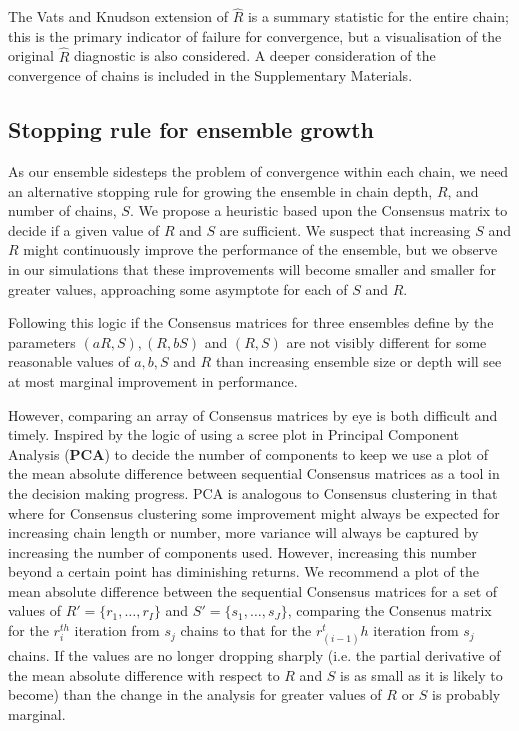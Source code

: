 \documentclass{bioinfo}
\begin{document}
The Vats and Knudson extension of $\hat{R}$ is a summary statistic for the entire chain; this is the primary indicator of failure for convergence, but a visualisation of the original $\hat{R}$ diagnostic is also considered. A deeper consideration of the convergence of chains is included in the Supplementary Materials.

\subsection{Stopping rule for ensemble growth} \label{sec:stopping}
As our ensemble sidesteps the problem of convergence within each chain, we need an alternative stopping rule for growing the ensemble in chain depth, $R$, and number of chains, $S$. We propose a heuristic based upon the Consensus matrix to decide if a given value of $R$ and $S$ are sufficient. We suspect that increasing $S$ and $R$ might continuously improve the performance of the ensemble, but we observe in our simulations that these improvements will become smaller and smaller for greater values, approaching some asymptote for each of $S$ and $R$. 

Following this logic if the Consensus matrices for three ensembles define by the parameters $(aR, S), (R, bS)$ and $(R, S)$ are not visibly different for some reasonable values of $a, b, S$ and $R$ than increasing ensemble size or depth will see at most marginal improvement in performance. 

However, comparing an array of Consensus matrices by eye is both difficult and timely. Inspired by the logic of using a scree plot in Principal Component Analysis (\textbf{PCA}) to decide the number of components to keep we use a plot of the mean absolute difference between sequential Consensus matrices as a tool in the decision making progress. PCA is analogous to Consensus clustering in that where for Consensus clustering some improvement might always be expected for increasing chain length or number, more variance will always be captured by increasing the number of components used. However, increasing this number beyond a certain point has diminishing returns. We recommend a plot of the mean absolute difference between the sequential Consensus matrices for a set of values of $R' = \{r_1, \ldots, r_I\}$ and $S'=\{s_1, \ldots, s_J\}$, comparing the Consenus matrix for the $r_i^{th}$ iteration from $s_j$ chains to that for the $r_{(i-1)}^th$ iteration from $s_j$ chains. If the values are no longer dropping sharply (i.e. the partial derivative of the mean absolute difference with respect to $R$ and $S$ is as small as it is likely to become) than the change in the analysis for greater values of $R$ or $S$ is probably marginal.
\end{document}
